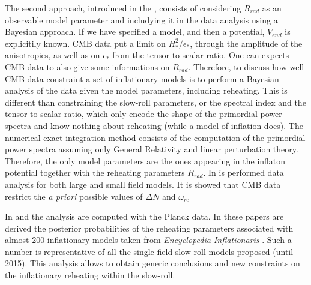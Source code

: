 \documentclass[11pt,a4paper,twoside]{book}
\begin{document}
The second approach, introduced in the \cite{Chap3:Martin_Ringeval}, consists of considering $ R_{rad} $ as an observable model parameter and includying it in the data analysis using a Bayesian approach. If we have specified a model, and then a potential, $ V_{end} $ is explicitily known. CMB data put a limit on $ H_{*}^{2}/\epsilon_{*} $, through the amplitude of the anisotropies, as well as on $\epsilon_{*}$ from the tensor-to-scalar ratio. One can expects CMB data to also give some informations on $ R_{rad} $. Therefore, to discuss how well CMB data constraint a set of inflationary models is to perform a Bayesian analysis of the data given the model parameters, including reheating. This is different than constraining the slow-roll parameters, or the spectral index and the tensor-to-scalar ratio, which only encode the shape of the primordial power spectra and know nothing about reheating (while a model of inflation does). The numerical exact integration method consists of the computation of the primordial power spectra assuming only General Relativity and linear perturbation theory. Therefore, the only model parameters are the ones appearing in the inflaton potential together with the reheating parameters $ R_{rad} $. In \cite{Chap3:Martin_Ringeval} is performed data analysis for both  large and small field models. It is showed that CMB data restrict the \textit{a priori} possible values of $ \Delta N $ and $\bar{\omega}_{re}$

In \cite{Chap3:Martin_Observing_Reheating} and \cite{Chap3:Martin_Milestone} the analysis are computed with the Planck data. In these papers are derived the posterior probabilities of the reheating parameters associated with almost 200 inflationary models taken from \textit{Encyclopedia Inflationaris} \cite{Chap3:EncyclopediaInflationaris}. Such a number is representative of all the single-field slow-roll models proposed (until 2015). This analysis allows to obtain  generic conclusions and new constraints on the inflationary reheating within the slow-roll.
\end{document}
